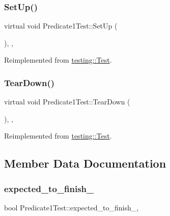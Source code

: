 \subsubsection{\texorpdfstring{SetUp()}{SetUp()}}
{\footnotesize\ttfamily virtual void Predicate1\+Test\+::\+Set\+Up (\begin{DoxyParamCaption}{ }\end{DoxyParamCaption})\hspace{0.3cm}{\ttfamily [inline]}, {\ttfamily [protected]}, {\ttfamily [virtual]}}



Reimplemented from \mbox{\hyperlink{classtesting_1_1Test_a190315150c303ddf801313fd1a777733}{testing\+::\+Test}}.

\mbox{\label{classPredicate1Test_ad2974af5c6abc508847c3a9912b24a90}} 
\subsubsection{\texorpdfstring{TearDown()}{TearDown()}}
{\footnotesize\ttfamily virtual void Predicate1\+Test\+::\+Tear\+Down (\begin{DoxyParamCaption}{ }\end{DoxyParamCaption})\hspace{0.3cm}{\ttfamily [inline]}, {\ttfamily [protected]}, {\ttfamily [virtual]}}



Reimplemented from \mbox{\hyperlink{classtesting_1_1Test_a5f0ab439802cbe0ef7552f1a9f791923}{testing\+::\+Test}}.



\subsection{Member Data Documentation}
\mbox{\label{classPredicate1Test_ad91cfa58e6352d53abacce32df2ef635}} 
\subsubsection{\texorpdfstring{expected\_to\_finish\_}{expected\_to\_finish\_}}
{\footnotesize\ttfamily bool Predicate1\+Test\+::expected\+\_\+to\+\_\+finish\+\_\+\hspace{0.3cm}{\ttfamily [static]}, {\ttfamily [protected]}}

